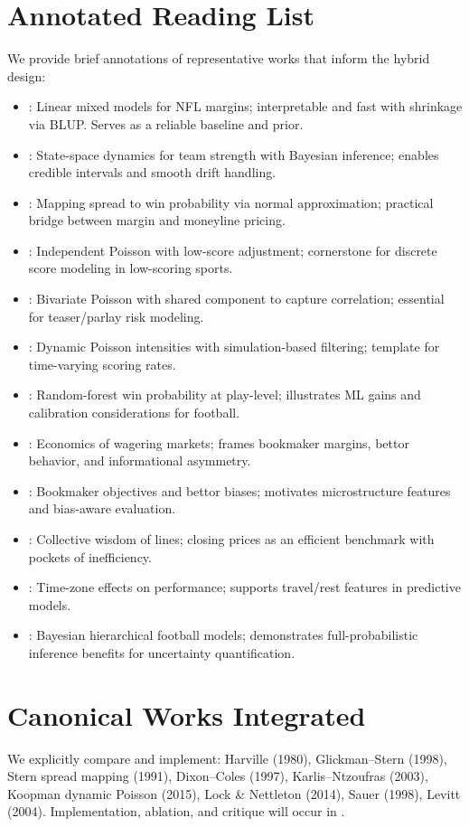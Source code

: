 \section{Annotated Reading List}
We provide brief annotations of representative works that inform the hybrid design:
\begin{itemize}
  \item \citet{harville1980}: Linear mixed models for NFL margins; interpretable and fast with shrinkage via BLUP. Serves as a reliable baseline and prior.
  \item \citet{glickman1998}: State-space dynamics for team strength with Bayesian inference; enables credible intervals and smooth drift handling.
  \item \citet{stern1991}: Mapping spread to win probability via normal approximation; practical bridge between margin and moneyline pricing.
  \item \citet{dixon1997}: Independent Poisson with low-score adjustment; cornerstone for discrete score modeling in low-scoring sports.
  \item \citet{karlis2003}: Bivariate Poisson with shared component to capture correlation; essential for teaser/parlay risk modeling.
  \item \citet{koopman2015}: Dynamic Poisson intensities with simulation-based filtering; template for time-varying scoring rates.
  \item \citet{lock2014}: Random-forest win probability at play-level; illustrates ML gains and calibration considerations for football.
  \item \citet{sauer1998}: Economics of wagering markets; frames bookmaker margins, bettor behavior, and informational asymmetry.
  \item \citet{levitt2004}: Bookmaker objectives and bettor biases; motivates microstructure features and bias-aware evaluation.
  \item \citet{szalkowski2012}: Collective wisdom of lines; closing prices as an efficient benchmark with pockets of inefficiency.
  \item \citet{nichols2014}: Time-zone effects on performance; supports travel/rest features in predictive models.
  \item \citet{baio2010}: Bayesian hierarchical football models; demonstrates full-probabilistic inference benefits for uncertainty quantification.
\end{itemize}

\section{Canonical Works Integrated}
\label{sec:canon}
We explicitly compare and implement: Harville (1980), Glickman–Stern (1998), Stern spread mapping (1991), Dixon–Coles (1997), Karlis–Ntzoufras (2003), Koopman dynamic Poisson (2015), Lock \& Nettleton (2014), Sauer (1998), Levitt (2004).  
Implementation, ablation, and critique will occur in .

